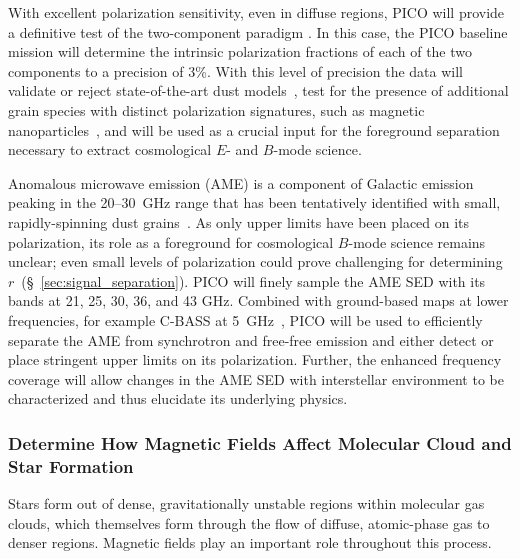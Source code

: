 \documentclass[PICOAPC.tex]{subfiles}
\begin{document}
With excellent polarization sensitivity, even in diffuse regions, PICO will provide a definitive test of the two-component paradigm \citep{Meisner2015}. 
In this case, the PICO baseline mission will determine the intrinsic polarization fractions of each of the two components to a precision of 3\%. With this level of precision the data will validate or reject state-of-the-art dust models~\citep[e.g.][]{Draine2009,Guillet2018}, test for the presence of additional grain species with distinct polarization signatures, such as magnetic nanoparticles~\citep{Draine2013}, and will be used as a crucial input for the foreground separation necessary to extract cosmological $E$- and $B$-mode science. 

Anomalous microwave emission (AME) is a component of Galactic emission peaking in the 20--30~GHz range that has been tentatively identified with small, rapidly-spinning dust grains~\citep{dickinson/etal:2018}. As only upper limits have been placed on its polarization, its role as a foreground for cosmological $B$-mode science remains unclear; even small levels of polarization could prove challenging for determining $r$~(\S~\ref{sec:signal_separation}). PICO will finely sample the AME SED with its bands at 21, 25, 30, 36, and 43 GHz. Combined with ground-based maps at lower frequencies, for example C-BASS at 5~GHz~\citep{Dickinson2018a}, PICO will be used to efficiently separate the AME from synchrotron and free-free emission and either detect or place stringent upper limits on its polarization. Further, the enhanced frequency coverage will allow changes in the AME SED with interstellar environment to be characterized and thus elucidate its underlying physics.

\subsubsection{Determine How Magnetic Fields Affect Molecular Cloud and Star Formation}
\label{sec:magnetic_fields}

Stars form out of dense, gravitationally unstable regions within molecular gas clouds, which themselves form through the flow of diffuse, atomic-phase gas to denser regions. Magnetic fields play an important role throughout this process. 
\end{document}
